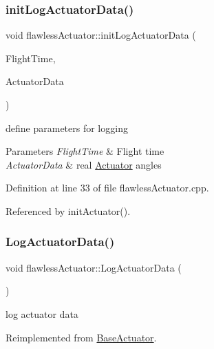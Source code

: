 \subsubsection{\texorpdfstring{init\+Log\+Actuator\+Data()}{initLogActuatorData()}}
{\footnotesize\ttfamily void flawless\+Actuator\+::init\+Log\+Actuator\+Data (\begin{DoxyParamCaption}\item[{\hyperlink{group___tools_ga3f1431cb9f76da10f59246d1d743dc2c}{Float64} \&}]{Flight\+Time,  }\item[{Actuator\+Struct \&}]{Actuator\+Data }\end{DoxyParamCaption})}



define parameters for logging 


\begin{DoxyParams}{Parameters}
{\em Flight\+Time} & Flight time \\
\hline
{\em Actuator\+Data} & real \hyperlink{class_actuator}{Actuator} angles \\
\hline
\end{DoxyParams}


Definition at line 33 of file flawless\+Actuator.\+cpp.



Referenced by init\+Actuator().

\mbox{\label{classflawless_actuator_a5cd61e149a795ba7db292101d4782bd5}} 
\subsubsection{\texorpdfstring{Log\+Actuator\+Data()}{LogActuatorData()}}
{\footnotesize\ttfamily void flawless\+Actuator\+::\+Log\+Actuator\+Data (\begin{DoxyParamCaption}{ }\end{DoxyParamCaption})\hspace{0.3cm}{\ttfamily [virtual]}}



log actuator data 



Reimplemented from \hyperlink{class_base_actuator_a60e40bc448e4bea4e079263dd7d78770}{Base\+Actuator}.



